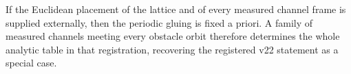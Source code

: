 \begin{corollary}
\label{cor:v23-registered-special-case}
If the Euclidean placement of the lattice and of every measured channel frame
is supplied externally, then the periodic gluing is fixed a priori.  A family
of measured channels meeting every obstacle orbit therefore determines the
whole analytic table in that registration, recovering the registered v22
statement as a special case.
\end{corollary}